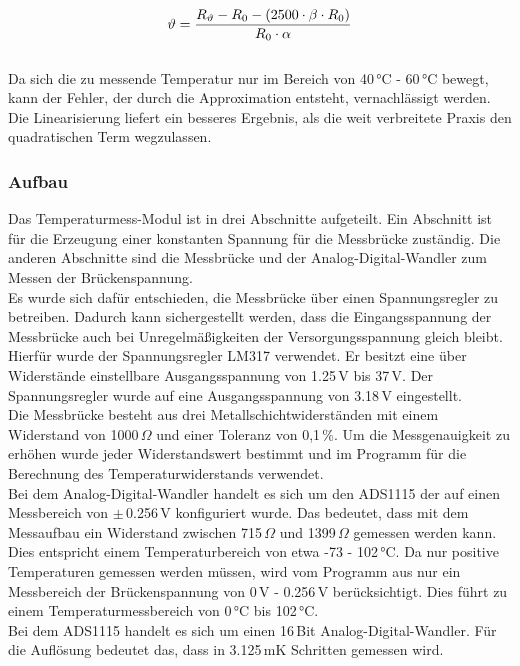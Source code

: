 \vspace{12pt}
\begin{equation}
	\setlength{\abovedisplayskip}{16pt}
	\setlength{\belowdisplayskip}{16pt}
	\vartheta = \frac{R_\vartheta - R_0 - (2500 \cdot \beta \cdot R_0)}{R_0 \cdot \alpha}
	\label{my_temperature_equation}
\end{equation}
\vspace{12pt}
\\
\noindent
Da sich die zu messende Temperatur nur im Bereich von 40\,°C - 60\,°C bewegt, kann der Fehler, der durch die Approximation entsteht, vernachlässigt werden. Die Linearisierung liefert ein besseres Ergebnis, als die weit verbreitete Praxis den quadratischen Term wegzulassen.

\subsubsection{Aufbau}
Das Temperaturmess-Modul ist in drei Abschnitte aufgeteilt. Ein Abschnitt ist für die Erzeugung einer konstanten Spannung für die Messbrücke zuständig. Die anderen Abschnitte sind die Messbrücke und der Analog-Digital-Wandler zum Messen der Brückenspannung.
\\
Es wurde sich dafür entschieden, die Messbrücke über einen Spannungsregler zu betreiben. Dadurch kann sichergestellt werden, dass die Eingangsspannung der Messbrücke auch bei Unregelmäßigkeiten der Versorgungsspannung gleich bleibt. Hierfür wurde der Spannungsregler LM317 verwendet. Er besitzt eine über Widerstände einstellbare Ausgangsspannung von 1.25\,V bis 37\,V. Der Spannungsregler wurde auf eine Ausgangsspannung von 3.18\,V eingestellt.
\cite{lm317_datasheet}
\\
Die Messbrücke besteht aus drei Metallschichtwiderständen mit einem Widerstand von 1000\,\(\Omega\) und einer Toleranz von 0,1\,\%. Um die Messgenauigkeit zu erhöhen wurde jeder Widerstandswert bestimmt und im Programm für die Berechnung des Temperaturwiderstands verwendet.
\\
Bei dem Analog-Digital-Wandler handelt es sich um den ADS1115 der auf einen Messbereich von \(\pm\)\,0.256\,V konfiguriert wurde. Das bedeutet, dass mit dem Messaufbau ein Widerstand zwischen 715\,\(\Omega\) und 1399\,\(\Omega\) gemessen werden kann. Dies entspricht einem Temperaturbereich von etwa -73 - 102\,°C. Da nur positive Temperaturen gemessen werden müssen, wird vom Programm aus nur ein Messbereich der Brückenspannung von 0\,V - 0.256\,V berücksichtigt. Dies führt zu einem Temperaturmessbereich von 0\,°C bis 102\,°C.
\\
Bei dem ADS1115 handelt es sich um einen 16\,Bit Analog-Digital-Wandler. Für die Auflösung bedeutet das, dass in 3.125\,mK Schritten gemessen wird.

